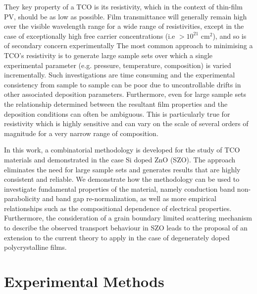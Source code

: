 \documentclass[aps,prl,preprint,showpacs,showkeys, linenumbers]{revtex4-1}
\begin{document}
They key property of a TCO is its resistivity, which in the context of thin-film PV, should be as low as possible. Film transmittance will generally remain high over the visible wavelength range for a wide range of resistivities, except in the case of exceptionally high free carrier concentrations (i.e $>10^{21}$ cm$^2$), and so is of secondary concern experimentally The most common approach to minimising a TCO's resistivity is to generate large sample sets over which a single experimental parameter (e.g. pressure, temperature, composition)  is varied incrementally. Such investigations are time consuming and the experimental consistency from sample to sample can be poor due to uncontrollable drifts in other associated deposition parameters. Furthermore, even for large sample sets the relationship determined between the resultant film properties and the deposition conditions can often be ambiguous. This is particularly true for resistivity which is highly sensitive and can vary on the scale of several orders of magnitude for a very narrow range of composition.

In this work, a combinatorial methodology is developed for the study of TCO materials and demonstrated in the case Si doped ZnO (SZO). The approach eliminates the need for large sample sets and generates results that are highly consistent and reliable. We demonstrate how the methodology can be used to investigate fundamental properties of the material, namely conduction band non-parabolicity and band gap re-normalization, as well as more empirical relationships such as the compositional dependence of electrical properties. Furthermore, the consideration of a grain boundary limited scattering mechanism to describe the observed transport behaviour in SZO leads to the proposal of an extension to the current theory to apply in the case of degenerately doped polycrystalline films.


\section{Experimental Methods}
\end{document}
